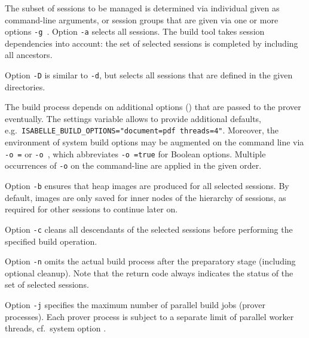 \begin{isabellebody}
\begin{isamarkuptext}
  \medskip The subset of sessions to be managed is determined via
  individual  given as command-line arguments, or
  session groups that are given via one or more options \verb|-g|~.  Option \verb|-a| selects all sessions.
  The build tool takes session dependencies into account: the set of
  selected sessions is completed by including all ancestors.

  \medskip Option \verb|-D| is similar to \verb|-d|, but
  selects all sessions that are defined in the given directories.

  \medskip The build process depends on additional options
  () that are passed to the prover
  eventually.  The settings variable \hyperlink{setting.ISABELLE-BUILD-OPTIONS}{\mbox{}} allows to provide additional defaults, e.g.\
  \texttt{ISABELLE_BUILD_OPTIONS="document=pdf threads=4"}. Moreover,
  the environment of system build options may be augmented on the
  command line via \verb|-o|~\verb|=| or \verb|-o|~, which
  abbreviates \verb|-o|~\isa{{\isaliteral{22}{\isachardoublequote}}name{\isaliteral{22}{\isachardoublequote}}}\verb|=true| for
  Boolean options.  Multiple occurrences of \verb|-o| on the
  command-line are applied in the given order.

  \medskip Option \verb|-b| ensures that heap images are
  produced for all selected sessions.  By default, images are only
  saved for inner nodes of the hierarchy of sessions, as required for
  other sessions to continue later on.

  \medskip Option \verb|-c| cleans all descendants of the
  selected sessions before performing the specified build operation.

  \medskip Option \verb|-n| omits the actual build process
  after the preparatory stage (including optional cleanup).  Note that
  the return code always indicates the status of the set of selected
  sessions.

  \medskip Option \verb|-j| specifies the maximum number of
  parallel build jobs (prover processes).  Each prover process is
  subject to a separate limit of parallel worker threads, cf.\ system
  option \indexref{}{system option}{threads}\hyperlink{system option.threads}{\mbox{}}.


\end{isamarkuptext}
\end{isabellebody}
